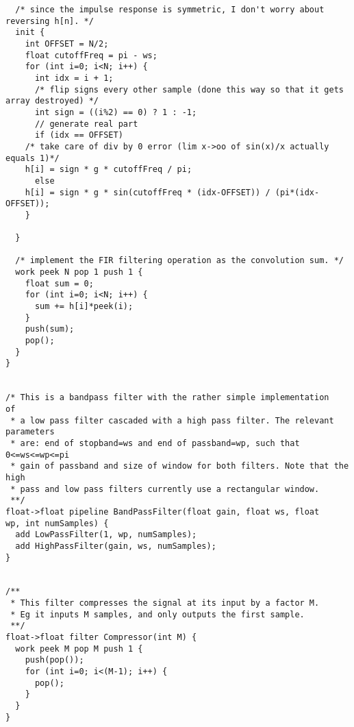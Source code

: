 \begin{scriptsize}
\begin{verbatim}
  /* since the impulse response is symmetric, I don't worry about reversing h[n]. */
  init {
    int OFFSET = N/2;
    float cutoffFreq = pi - ws;
    for (int i=0; i<N; i++) {
      int idx = i + 1;
      /* flip signs every other sample (done this way so that it gets array destroyed) */
      int sign = ((i%2) == 0) ? 1 : -1;
      // generate real part
      if (idx == OFFSET)
    /* take care of div by 0 error (lim x->oo of sin(x)/x actually equals 1)*/
    h[i] = sign * g * cutoffFreq / pi;
      else
    h[i] = sign * g * sin(cutoffFreq * (idx-OFFSET)) / (pi*(idx-OFFSET));
    }

  }

  /* implement the FIR filtering operation as the convolution sum. */
  work peek N pop 1 push 1 {
    float sum = 0;
    for (int i=0; i<N; i++) {
      sum += h[i]*peek(i);
    }
    push(sum);
    pop();
  }
}


/* This is a bandpass filter with the rather simple implementation
of
 * a low pass filter cascaded with a high pass filter. The relevant parameters
 * are: end of stopband=ws and end of passband=wp, such that 0<=ws<=wp<=pi
 * gain of passband and size of window for both filters. Note that the high
 * pass and low pass filters currently use a rectangular window.
 **/
float->float pipeline BandPassFilter(float gain, float ws, float
wp, int numSamples) {
  add LowPassFilter(1, wp, numSamples);
  add HighPassFilter(gain, ws, numSamples);
}


/**
 * This filter compresses the signal at its input by a factor M.
 * Eg it inputs M samples, and only outputs the first sample.
 **/
float->float filter Compressor(int M) {
  work peek M pop M push 1 {
    push(pop());
    for (int i=0; i<(M-1); i++) {
      pop();
    }
  }
}

\end{verbatim}
\end{scriptsize}


